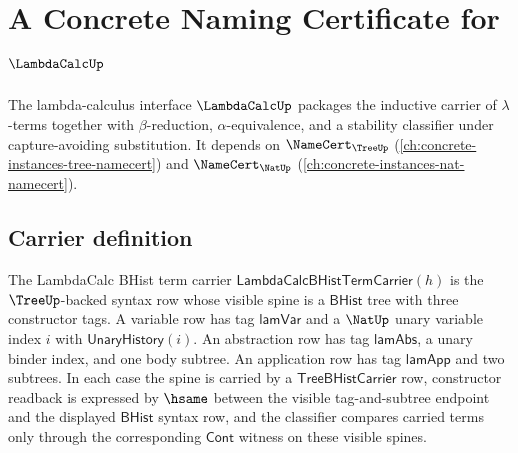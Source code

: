 \chapter{A Concrete Naming Certificate for $\LambdaCalcUp$}
\label{ch:concrete-instances-lambdacalc-namecert}

The lambda-calculus interface $\LambdaCalcUp$ packages the inductive carrier of $\lambda$-terms together with $\beta$-reduction, $\alpha$-equivalence, and a stability classifier under capture-avoiding substitution. It depends on $\NameCert_{\TreeUp}$ (\autoref{ch:concrete-instances-tree-namecert}) and $\NameCert_{\NatUp}$ (\autoref{ch:concrete-instances-nat-namecert}).

\section{Carrier definition}
\label{sec:lambdacalc-carrier}

\begin{definition}
\label{def:lambdacalc-bhist-term-carrier}
The LambdaCalc BHist term carrier $\mathsf{LambdaCalcBHistTermCarrier}(h)$ is
the $\TreeUp$-backed syntax row whose visible spine is a $\mathsf{BHist}$ tree with
three constructor tags. A variable row has tag $\mathsf{lamVar}$ and a
$\NatUp$ unary variable index $i$ with $\mathsf{UnaryHistory}(i)$. An
abstraction row has tag $\mathsf{lamAbs}$, a unary binder index, and one body
subtree. An application row has tag $\mathsf{lamApp}$ and two subtrees. In each
case the spine is carried by a $\mathsf{TreeBHistCarrier}$ row, constructor
readback is expressed by $\hsame$ between the visible tag-and-subtree endpoint
and the displayed $\mathsf{BHist}$ syntax row, and the classifier compares carried
terms only through the corresponding $\mathsf{Cont}$ witness on these visible
spines.
\end{definition}

